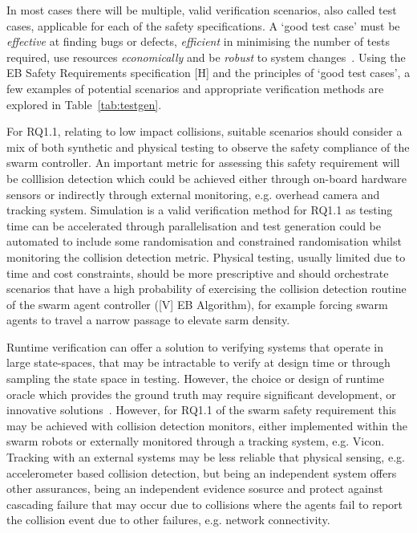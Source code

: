 \documentclass[lettersize,journal]{IEEEtran}
\begin{document}
In most cases there will be multiple, valid verification scenarios, also called test cases, applicable for each of the safety specifications. A `good test case' must be \emph{effective} at finding bugs or defects, \emph{efficient} in minimising the number of tests required, use resources \emph{economically} and be \emph{robust} to system changes~\cite{Fewster1999}. Using the EB Safety Requirements specification [H] and the principles of `good test cases', a few examples of potential scenarios and appropriate verification methods are explored in Table~\ref{tab:testgen}. 


For RQ1.1, relating to low impact collisions, suitable scenarios should consider a mix of both synthetic and physical testing to observe the safety compliance of the swarm controller. An important metric for assessing this safety requirement will be colllision detection which could be achieved either through on-board hardware sensors or indirectly through external monitoring, e.g. overhead camera and tracking system. Simulation is a valid verification method for RQ1.1 as testing time can be accelerated through parallelisation and test generation could be automated to include some randomisation and constrained randomisation whilst monitoring the collision detection metric. Physical testing, usually limited due to time and cost constraints, should be more prescriptive and should orchestrate scenarios that have a high probability of exercising the collision detection routine of the swarm agent controller ([V] EB Algorithm), for example forcing swarm agents to travel a narrow passage to elevate sarm density. 

Runtime verification can offer a solution to verifying systems that operate in large state-spaces, that may be intractable to verify at design time or through sampling the state space in testing. However, the choice or design of runtime oracle which provides the ground truth may require significant development, or innovative solutions~\cite{maple2020cyres}. However, for RQ1.1 of the swarm safety requirement this may be achieved with collision detection monitors, either implemented within the swarm robots or externally monitored through a tracking system, e.g. Vicon. Tracking with an external systems may be less reliable that physical sensing, e.g. accelerometer based collision detection, but being an independent system offers other assurances, being an independent evidence sosurce and protect against cascading failure that may occur due to collisions where the agents fail to report the collision event due to other failures, e.g. network connectivity.
\end{document}
